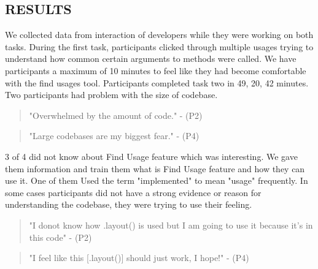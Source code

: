 \documentclass[conference]{IEEEtran}
\begin{document}
\subsection{RESULTS}
We collected data from interaction of developers while they were working on both tasks. During the first task, participants clicked through multiple usages trying to understand how common certain arguments to methods were called. We have participants a maximum of 10 minutes to feel like they had become comfortable with the find usages tool. Participants completed task two in 49, 20, 42 minutes. Two participants had problem with the size of codebase.
\begin{quote}"Overwhelmed by the amount of code." - (P2) \end{quote}
\begin{quote}"Large codebases are my biggest fear." - (P4) \end{quote}
3 of 4 did not know about Find Usage feature which was interesting. We gave them information and train them what is Find Usage feature and how they can use it. One of them Used the term "implemented" to mean "usage" frequently. In some cases participants did not have a strong evidence or reason for understanding the codebase, they were trying to use their feeling. 
\begin{quote}"I donot know how .layout() is used but I am going to use it because it's in this code" - (P2) \end{quote}
\begin{quote}"I feel like this [.layout()] should just work, I hope!" - (P4) \end{quote}
\end{document}
